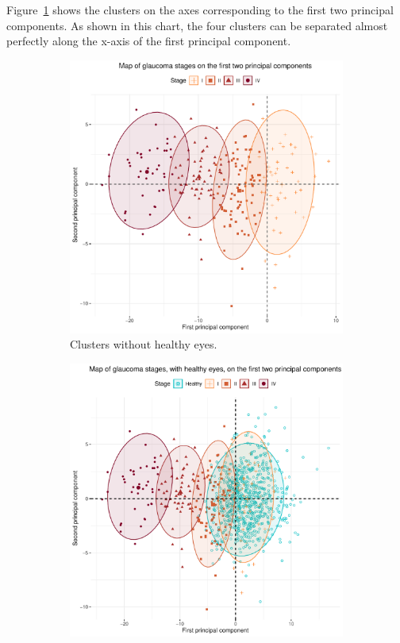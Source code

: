 \documentclass[fleqn,10pt]{wlscirep}
\begin{document}
Figure~\ref{fig:clusters-whithout-healty-eyes} shows the clusters on the axes corresponding to the first two principal components. As shown in this chart, the four clusters can be separated almost perfectly along the x-axis of the first principal component.

\begin{figure}
\centering
\begin{subfigure}[b]{0.49\textwidth}
\centering
\includegraphics[width=\textwidth]{img/map-clusters-whithout-healthy.pdf}
\caption{Clusters without healthy eyes.}
\label{fig:clusters-whithout-healty-eyes}
\end{subfigure}
\begin{subfigure}[b]{0.49\textwidth}
\centering
\includegraphics[width=\textwidth]{img/map-clusters-with-healthy.pdf}

\end{subfigure}
\end{figure}
\end{document}
